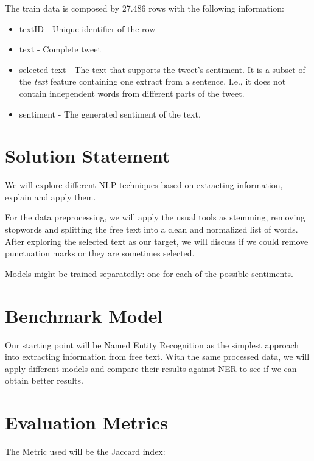 \documentclass[11pt]{article}
\begin{document}
The train data is composed by 27.486 rows with the following information:
\begin{itemize}
    \item textID - Unique identifier of the row
    \item text - Complete tweet
    \item selected text - The text that supports the tweet's sentiment. It is a subset of the \textit{text} feature containing one extract from a sentence. I.e., it does not contain independent words from different parts of the tweet.
    \item sentiment - The generated sentiment of the text.
\end{itemize}

\section{Solution Statement}

We will explore different NLP techniques based on extracting information, explain and apply them.

For the data preprocessing, we will apply the usual tools as stemming, removing stopwords and splitting the free text into a clean and normalized list of words. After exploring the selected text as our target, we will discuss if we could remove punctuation marks or they are sometimes selected.

Models might be trained separatedly: one for each of the possible sentiments.

\section{Benchmark Model}

Our starting point will be Named Entity Recognition as the simplest approach into extracting information from free text.
With the same processed data, we will apply different models and compare their results against NER to see if we can obtain better results.



\section{Evaluation Metrics}

The Metric used will be the \href{https://en.wikipedia.org/wiki/Jaccard_index}{Jaccard index}:
\end{document}
